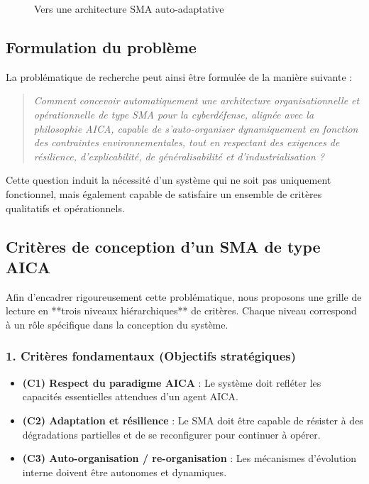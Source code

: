 \documentclass[ twoside,openright,titlepage,numbers=noenddot,headinclude,%
                footinclude=true,cleardoublepage=empty,abstractoff, %
                BCOR=5mm,paper=a4,fontsize=11pt,%
                french,american,%
                ]{scrreprt}
\begin{document}
\begin{figure}[H]
\centering
{}
\caption{Vers une architecture SMA auto-adaptative}
\end{figure}

\subsection*{Formulation du problème}

La problématique de recherche peut ainsi être formulée de la manière suivante :

\begin{quote}
\textit{Comment concevoir automatiquement une architecture organisationnelle et opérationnelle de type SMA pour la cyberdéfense, alignée avec la philosophie AICA, capable de s’auto-organiser dynamiquement en fonction des contraintes environnementales, tout en respectant des exigences de résilience, d’explicabilité, de généralisabilité et d’industrialisation ?}
\end{quote}

Cette question induit la nécessité d’un système qui ne soit pas uniquement fonctionnel, mais également capable de satisfaire un ensemble de critères qualitatifs et opérationnels.

\subsection*{Critères de conception d’un SMA de type AICA}

Afin d’encadrer rigoureusement cette problématique, nous proposons une grille de lecture en **trois niveaux hiérarchiques** de critères. Chaque niveau correspond à un rôle spécifique dans la conception du système.

\subsubsection*{1. Critères fondamentaux (Objectifs stratégiques)}

\begin{itemize}
  \item \textbf{(C1) Respect du paradigme AICA} : Le système doit refléter les capacités essentielles attendues d’un agent AICA.
  \item \textbf{(C2) Adaptation et résilience} : Le SMA doit être capable de résister à des dégradations partielles et de se reconfigurer pour continuer à opérer.
  \item \textbf{(C3) Auto-organisation / re-organisation} : Les mécanismes d’évolution interne doivent être autonomes et dynamiques.
\end{itemize}
\end{document}
